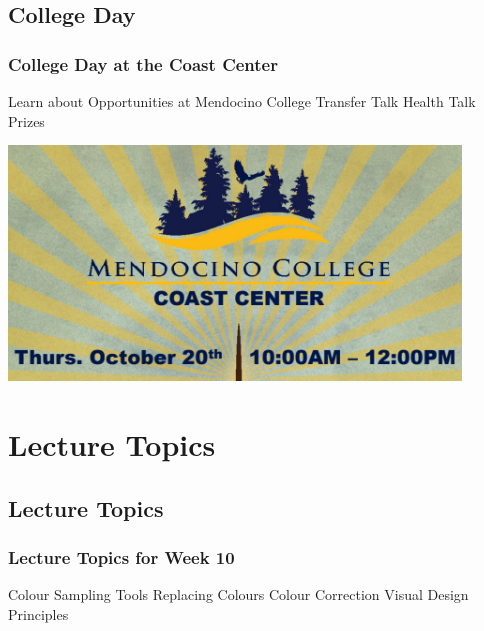 \documentclass{beamer}
\begin{document}
			\subsection{College Day}		
			\begin{frame}
				\frametitle{College Day at the Coast Center}
				\begin{outline}
					\1 Learn about Opportunities at Mendocino College
					\1 Transfer Talk
					\1 Health Talk
					\1 Prizes
				\end{outline}
				\includegraphics[width=0.9\textwidth]{images/college day.png}
			\end{frame}

	\section{Lecture Topics}
			\subsection{Lecture Topics}		
	\begin{frame}
		\frametitle{Lecture Topics for Week 10}
				\begin{outline}
					\1 Colour Sampling Tools
					\1 Replacing Colours
					\1 Colour Correction
					\1 Visual Design Principles
				\end{outline}
		\end{frame}
\end{document}
